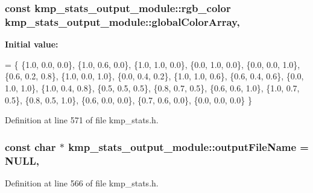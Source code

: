 \hypertarget{classkmp__stats__output__module_a578d32fddbaab00f209b626829d85fa2}{
\subsubsection[{global\-Color\-Array}]{\setlength{\rightskip}{0pt plus 5cm}const {\bf kmp\-\_\-stats\-\_\-output\-\_\-module\-::rgb\-\_\-color} kmp\-\_\-stats\-\_\-output\-\_\-module\-::global\-Color\-Array\hspace{0.3cm}{\ttfamily [static]}, {\ttfamily [private]}}}\label{classkmp__stats__output__module_a578d32fddbaab00f209b626829d85fa2}
{\bfseries Initial value\-:}
\begin{DoxyCode}
= \{
    \{1.0, 0.0, 0.0\}, 
    \{1.0, 0.6, 0.0\}, 
    \{1.0, 1.0, 0.0\}, 
    \{0.0, 1.0, 0.0\}, 
    \{0.0, 0.0, 1.0\}, 
    \{0.6, 0.2, 0.8\}, 
    \{1.0, 0.0, 1.0\}, 
    \{0.0, 0.4, 0.2\}, 
    \{1.0, 1.0, 0.6\}, 
    \{0.6, 0.4, 0.6\}, 
    \{0.0, 1.0, 1.0\}, 
    \{1.0, 0.4, 0.8\}, 
    \{0.5, 0.5, 0.5\}, 
    \{0.8, 0.7, 0.5\}, 
    \{0.6, 0.6, 1.0\}, 
    \{1.0, 0.7, 0.5\}, 
    \{0.8, 0.5, 1.0\}, 
    \{0.6, 0.0, 0.0\}, 
    \{0.7, 0.6, 0.0\}, 
    \{0.0, 0.0, 0.0\}  
\}
\end{DoxyCode}


Definition at line 571 of file kmp\-\_\-stats.\-h.

\hypertarget{classkmp__stats__output__module_a6df3664723fafa911c12fb75870a98ae}{
\subsubsection[{output\-File\-Name}]{\setlength{\rightskip}{0pt plus 5cm}const char $\ast$ kmp\-\_\-stats\-\_\-output\-\_\-module\-::output\-File\-Name = N\-U\-L\-L\hspace{0.3cm}{\ttfamily [static]}, {\ttfamily [private]}}}\label{classkmp__stats__output__module_a6df3664723fafa911c12fb75870a98ae}


Definition at line 566 of file kmp\-\_\-stats.\-h.


